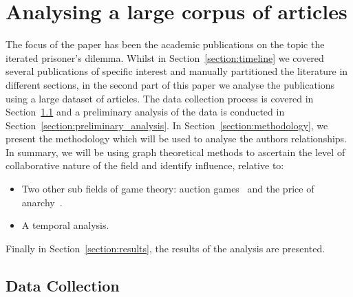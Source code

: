 \documentclass{article}
\theoremstyle{definition}
\begin{document}


\section{Analysing a large corpus of articles}\label{section:analysis}

The focus of the paper has been the academic publications on the topic the iterated
prisoner's dilemma. Whilst in Section~\ref{section:timeline} we covered
several publications of specific interest and manually partitioned the literature
in different sections, in the second part of this paper we analyse the publications
using a large dataset of articles. The data collection process is covered in
Section~\ref{section:data_collection} and a preliminary analysis of the data is
conducted in Section~\ref{section:preliminary_analysis}. In Section~\ref{section:methodology},
we present the methodology which will be used to analyse the authors relationships.
In summary, we will be using graph theoretical methods to ascertain the level of
collaborative nature of the field and identify influence, relative to:

\begin{itemize}
    \item Two other sub fields of game theory: auction games~\cite{menezes2005} and 
    the price of anarchy~\cite{roughgarden2005}.
    \item A temporal analysis.
\end{itemize}

Finally in Section~\ref{section:results}, the results of the analysis are presented.

\subsection{Data Collection}\label{section:data_collection}
\end{document}
